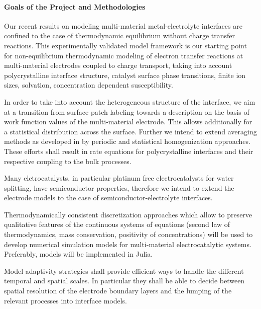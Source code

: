 \documentclass[a4paper,10pt]{article}
\begin{document}
\paragraph{Goals of the Project and Methodologies}
Our recent results on modeling multi-material metal-electrolyte interfaces are confined to the case of thermodynamic equilibrium without charge transfer reactions. This experimentally validated model framework is our starting point for non-equilibrium thermodynamic modeling of electron transfer reactions at multi-material electrodes coupled to charge transport, taking into account polycrystalline interface structure, catalyst surface phase transitions, finite ion sizes, solvation, concentration dependent susceptibility.

In order to take into account  the heterogeneous structure of the interface, we aim at a transition from surface patch labeling towards a description %
on the basis of work function values of the multi-material electrode. This allows additionally for a statistical distribution across the surface. Further we intend to extend averaging methods as developed in \cite{JES}  by periodic and statistical homogenization approaches.
%
These efforts shall result in  rate   equations  for polycrystalline interfaces  and their respective coupling to the bulk processes.

Many eletrocatalysts, in particular platinum free electrocatalysts for water splitting, have semiconductor properties, therefore we intend to extend the electrode models to the case of semiconductor-electrolyte interfaces.

Thermodynamically consistent discretization approaches which allow to preserve qualitative features of the continuous systems of equations  (second law of thermodynamics, mass conservation, positivity of concentrations) will be used to  develop numerical simulation models for multi-material electrocatalytic systems.  Preferably, models will be implemented in  Julia.

Model adaptivity strategies shall provide efficient ways to handle the different temporal and spatial scales. %
In particular they shall be able to decide between spatial resolution of the electrode boundary layers and the lumping of the relevant processes into interface models.
\end{document}
